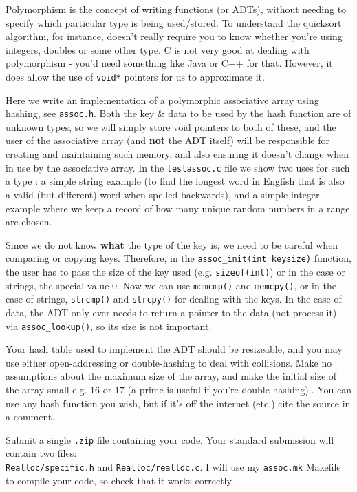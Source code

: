 
Polymorphism is the concept of writing functions (or ADTs), without
needing to specify which particular type is being used/stored. To
understand the quicksort algorithm, for instance, doesn't really require
you to know whether you're using integers, doubles or some other type. C
is not very good at dealing with polymorphism - you'd need something
like Java or C++ for that. However, it does allow the use of
\verb^void*^ pointers for us to approximate it.

\begin{exercise}
\label{ex:hahspoly}
Here we write an implementation of a polymorphic associative array using
hashing, see \verb^assoc.h^. Both the key \& data to be used by the hash
function are of
unknown types, so we will simply store void pointers to
both of these, and the user of the associative array (and {\bf not} the
ADT itself) will be responsible for creating and maintaining such memory,
and also ensuring it doesn't change when in use by the associative array.
In the \verb^testassoc.c^ file we show two uses for such a type :
a simple string example (to find the longest word in English that is
also a valid (but different) word when spelled backwards), and a simple
integer example where we keep a record of how many unique random numbers
in a range are chosen.

Since we do not know {\bf what} the type of the key is, we
need to be careful when comparing or copying keys. Therefore, in the
\verb^assoc_init(int keysize)^ function, the user has to pass the size of the
key used (e.g. \verb^sizeof(int)^) or in the case or strings, the special value $0$.
Now we can use \verb^memcmp()^ and \verb^memcpy()^, or in the case of strings, \verb^strcmp()^
and \verb^strcpy()^ for dealing with the keys. In the case of data, the ADT only ever needs
to return a pointer to the data (not process it) via
\verb^assoc_lookup()^, so its size is not important.

Your hash table used to implement the ADT should be resizeable, and you may use either
open-addressing or double-hashing to deal with collisions. Make no assumptions about
the maximum size of the array, and make the initial size of the array small e.g. $16$ or $17$
(a prime is useful if you're double hashing)..
You can use any hash function you wish, but if it's off the internet (etc.) cite
the source in a comment..

Submit a single \verb^.zip^ file containing your code.
Your standard submission will contain two files:\\
\verb^Realloc/specific.h^ and \verb^Realloc/realloc.c^.
I will use my \verb^assoc.mk^ Makefile to compile your code,
so check that it works correctly.
\end{exercise}

